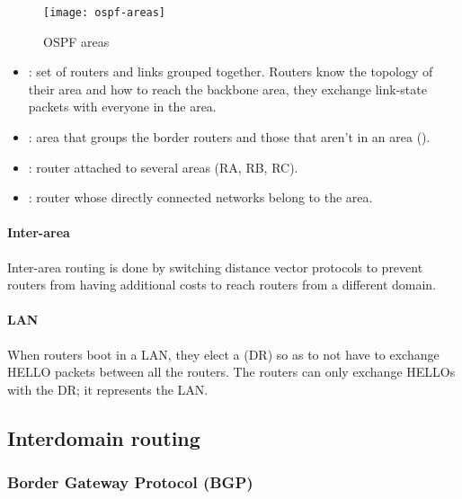 \begin{minipage}{0.38\textwidth}
	\begin{figure}[H]
		\centering
		\texttt{[image: ospf-areas]}
		\caption{OSPF areas}
	\end{figure}
\end{minipage}
\begin{minipage}{0.61\textwidth}
	\begin{itemize}
	\item {} : set of routers and links grouped together. Routers know the topology of their area and how to reach the backbone area, they exchange link-state packets with everyone in the area.
	\item {} : area that groups the border routers and those that aren’t in an area ().
	\item {} : router attached to several areas (RA, RB, RC).
	\item {} : router whose directly connected networks belong to the area.
	\end{itemize}
\end{minipage}

\paragraph*{Inter-area}

Inter-area routing is done by switching distance vector protocols to prevent routers from having additional costs to reach routers from a different domain.

\paragraph*{LAN}

When routers boot in a LAN, they elect a  (DR) so as to not have to exchange HELLO packets between all the routers. The routers can only exchange HELLOs with the DR; it represents the LAN.

\newpage
\subsection{Interdomain routing}

\subsubsection[BGP]{Border Gateway Protocol (BGP)}

